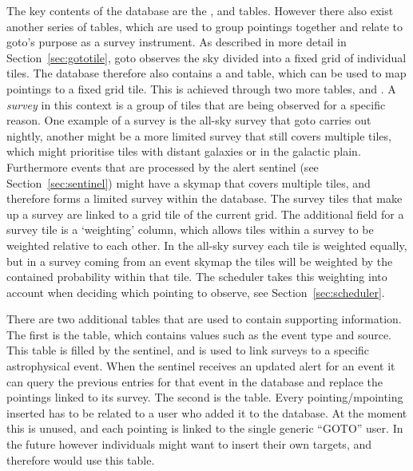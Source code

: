 \begin{colsection}
\begin{colsection}
The key contents of the database are the ,  and  tables. However there also exist another series of tables, which are used to group pointings together and relate to \gls{goto}'s purpose as a survey instrument. As described in more detail in Section~\ref{sec:gototile}, \gls{goto} observes the sky divided into a fixed grid of individual tiles. The database therefore also contains a and  table, which can be used to map pointings to a fixed grid tile. This is achieved through two more tables,  and . A \textit{survey} in this context is a group of tiles that are being observed for a specific reason. One example of a survey is the all-sky survey that \gls{goto} carries out nightly, another might be a more limited survey that still covers multiple tiles, which might prioritise tiles with distant galaxies or in the galactic plain. Furthermore events that are processed by the alert sentinel (see Section~\ref{sec:sentinel}) might have a skymap that covers multiple tiles, and therefore forms a limited survey within the database. The survey tiles that make up a survey are linked to a grid tile of the current grid. The additional field for a survey tile is a `weighting' column, which allows tiles within a survey to be weighted relative to each other. In the all-sky survey each tile is weighted equally, but in a survey coming from an event skymap the tiles will be weighted by the contained probability within that tile. The scheduler takes this weighting into account when deciding which pointing to observe, see Section~\ref{sec:scheduler}.

There are two additional tables that are used to contain supporting information. The first is the  table, which contains values such as the event type and source. This table is filled by the sentinel, and is used to link surveys to a specific astrophysical event. When the sentinel receives an updated alert for an event it can query the previous entries for that event in the database and replace the pointings linked to its survey. The second is the  table. Every pointing/mpointing inserted has to be related to a user who added it to the database. At the moment this is unused, and each pointing is linked to the single generic ``GOTO'' user. In the future however individuals might want to insert their own targets, and therefore would use this table.

\end{colsection}


\end{colsection}

